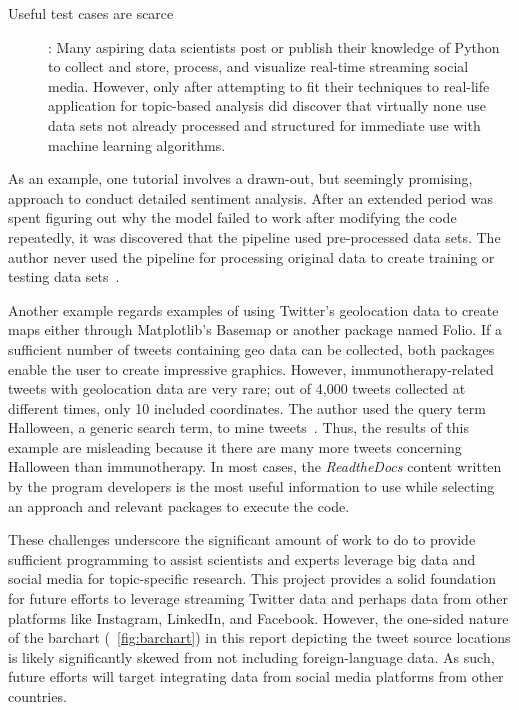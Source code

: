 \begin{description}

\item[Useful test cases are scarce]: Many aspiring data scientists
  post or publish their knowledge of Python to collect and store,
  process, and visualize real-time streaming social media.  However,
  only after attempting to fit their techniques to real-life
  application for topic-based analysis did 
 discover that virtually
  none use data sets not already processed and structured for
  immediate use with machine learning algorithms.
\end{description}

As an example, one tutorial involves a drawn-out, but seemingly
promising, approach to conduct detailed sentiment analysis.  After an
extended period was spent figuring out why the model failed to work
after modifying the code repeatedly, it was discovered that the
pipeline used pre-processed data sets.  The author never used the
pipeline for processing original data to create training or testing
data sets~\cite{cranfill2017}.

Another example regards examples of using Twitter's geolocation data
to create maps either through Matplotlib's Basemap or another package
named Folio. If a sufficient number of tweets containing geo data can
be collected, both packages enable the user to create impressive
graphics.  However, immunotherapy-related tweets with geolocation data
are very rare; out of 4,000 tweets collected at different times, only
10 included coordinates.  The author used the query term Halloween, a
generic search term, to mine tweets~\cite{ianbroad2014}.  Thus, the
results of this example are misleading because it there are many more
tweets concerning Halloween than immunotherapy.  In most cases, the
\emph{ReadtheDocs} content written by the program developers is the
most useful information to use while selecting an approach and
relevant packages to execute the code.

These challenges underscore the significant amount of work to do to
provide sufficient programming to assist scientists and experts
leverage big data and social media for topic-specific research.  This
project provides a solid foundation for future efforts to leverage
streaming Twitter data and perhaps data from other platforms like
Instagram, LinkedIn, and Facebook.  However, the one-sided nature of
the barchart (~\ref{fig:barchart}) in this report depicting the tweet
source locations is likely significantly skewed from not including
foreign-language data.  As such, future efforts will target
integrating data from social media platforms from other countries.

